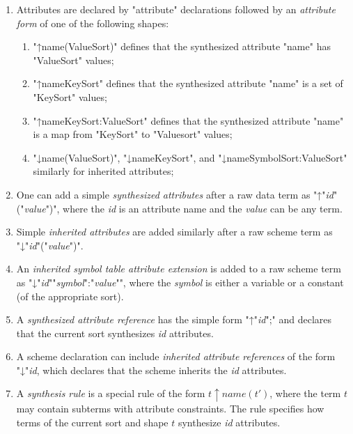 \documentclass[11pt]{article} %
\begin{document}
\begin{manual}\label{man:attributes}\leavevmode
  \begin{enumerate}

  \item Attributes are declared by "attribute" declarations followed by an \emph{attribute form} of
    one of the following shapes:
    \begin{enumerate}
    \item "↑name(ValueSort)" defines that the synthesized attribute "name" has "ValueSort" values;
    \item "↑name{KeySort}" defines that the synthesized attribute "name" is a set of "KeySort" values;
    \item "↑name{KeySort:ValueSort}" defines that the synthesized attribute "name" is a map from
      "KeySort" to "Valuesort" values;
    \item "↓name(ValueSort)", "↓name{KeySort}", and "↓name{SymbolSort:ValueSort}" similarly for
      inherited attributes;
    \end{enumerate}

  \item One can add a simple \emph{synthesized attributes} after a raw data term as
    "↑"\emph{id}"("\emph{value}")", where the \emph{id} is an attribute name and the
    \emph{value} can be any term.

  \item Simple \emph{inherited attributes} are added similarly after a raw scheme term as
    "↓"\emph{id}"("\emph{value}")".

  \item An \emph{inherited symbol table attribute extension} is added to a raw scheme term as
    "↓"\emph{id}"{"\emph{symbol}":"\emph{value}"}", where the \emph{symbol} is either a variable
    or a constant (of the appropriate sort).

  \item A \emph{synthesized attribute reference} has the simple form "↑"\emph{id}";" and declares
    that the current sort synthesizes \emph{id} attributes.

  \item A scheme declaration can include \emph{inherited attribute references} of the form
    "↓"\emph{id}, which declares that the scheme inherits the \emph{id} attributes.

  \item A \emph{synthesis rule} is a special rule of the form $t↑name(t')$, where the term $t$ may
    contain subterms with attribute constraints. The rule specifies how terms of the current sort
    and shape $t$ synthesize \emph{id} attributes.


\end{enumerate}
\end{manual}
\end{document}
